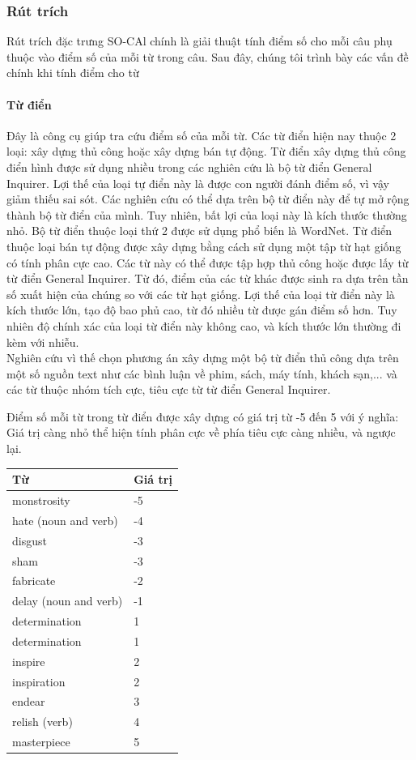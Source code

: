 \subsubsection*{Rút trích}
Rút trích đặc trưng SO-CAl chính là giải thuật tính điểm số cho mỗi câu phụ thuộc vào điểm số của mỗi từ trong câu. Sau đây, chúng tôi trình bày các vấn đề chính khi tính điểm cho từ
\paragraph*{Từ điển}
Đây là công cụ giúp tra cứu điểm số của mỗi từ. Các từ điển hiện nay thuộc 2 loại: xây dựng thủ công hoặc xây dựng bán tự động. Từ điển xây dựng thủ công điển hình được sử dụng nhiều trong các nghiên cứu là bộ từ điển General Inquirer. Lợi thế của loại tự điển này là được con người đánh điểm số, vì vậy giảm thiếu sai sót. Các nghiên cứu có thể dựa trên bộ từ điển này để tự mở rộng thành bộ từ điển của mình. Tuy nhiên, bất lợi của loại này là kích thước thường nhỏ. Bộ từ điển thuộc loại thứ 2 được sử dụng phổ biến là WordNet. Từ điển thuộc loại bán tự động được xây dựng bằng cách sử dụng một tập từ hạt giống có tính phân cực cao. Các từ này có thể được tập hợp thủ công hoặc được lấy từ từ điển General Inquirer. Từ đó, điểm của các từ khác được sinh ra dựa trên tần số xuất hiện của chúng so với các từ hạt giống. Lợi thế của loại từ điển này là kích thước lớn, tạo độ bao phủ cao, từ đó nhiều từ được gán điểm số hơn. Tuy nhiên độ chính xác của loại từ điển này không cao, và kích thước lớn thường đi kèm với nhiễu. \\

Nghiên cứu \cite{taboada2011lexicon} vì thế chọn phương án xây dựng một bộ từ điển thủ công dựa trên một số nguồn text như các bình luận về phim, sách, máy tính, khách sạn,... và các từ thuộc nhóm tích cực, tiêu cực từ từ điển General Inquirer. 

Điểm số mỗi từ trong từ điển được xây dựng có giá trị từ -5 đến 5 với ý nghĩa: Giá trị càng nhỏ thể hiện tính phân cực về phía tiêu cực càng nhiều, và ngược lại. 
\begin{table}[H]
\begin{tabular}{l l}
\hline
\textbf{Từ} & \textbf{Giá trị} 
\\ \hline
monstrosity & -5
\\ 
hate (noun and verb) & -4
\\ 
disgust & -3
\\ 
sham & -3
\\ 
fabricate & -2
\\ 
delay (noun and verb) & -1
\\
determination & 1
\\
determination & 1
\\ 
inspire & 2
\\ 
inspiration & 2
\\ 
endear & 3
\\ 
relish (verb) & 4
\\ 
masterpiece & 5
\\ \hline
\end{tabular}
\end{table}

